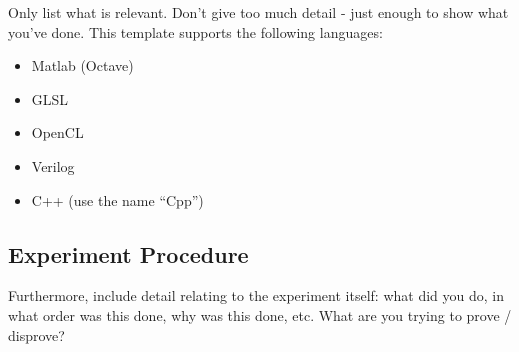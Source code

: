 Only list what is relevant.  Don't give too much detail - just enough to show what you've done.  This template supports the following languages:

\begin{itemize}
 \item Matlab (Octave)
 \item GLSL
 \item OpenCL
 \item Verilog
 \item C++ (use the name ``Cpp'')
\end{itemize}
  
\subsection{Experiment Procedure}
Furthermore, include detail relating to the experiment itself: what did you do, in what order was this done, why was this done, etc.  What are you trying to prove / disprove?